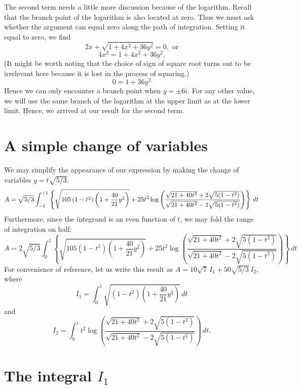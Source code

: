 \documentclass[12pt]{article}
\begin{document}
The second term needs a little more discussion because of the logarithm.  Recall that the branch point of the logarithm is also located at zero.  Thus we must ask whether the argument can equal zero along the path of integration.
Setting it equal to zero, we find
 $$2x + \sqrt{ 1 + 4 x^2 + 36 y^2 } = 0,\mbox{ or}$$
 $$4x^2 = 1 + 4 x^2 + 36 y^2.$$
(It might be worth noting that the choice of sign of square root turns out to be irrelevant here because it is lost in the process of squaring.)
 $$0 = 1 + 36 y^2$$
Hence we can only encounter a branch point when $y = \pm 6 i$.  For any other value, we will use the same branch of the logarithm at the upper limit as at the lower limit.   Hence, we arrived at our result for the second term.

\section{A simple change of variables}

We may simplify the appearance of our expression by making the change of variables $y = t \sqrt{5/3}$.
 $$A = \sqrt{5/3} \int_{-1}^{+1} \left\{ \sqrt{ 105 \left( 1 - t^2 \right) \left( 1 + {40 \over 21} y^2 \right) } + 25 t^2 \log \left( \frac{\sqrt{21 + 40 t^2} + 2 \sqrt{5(1 - t^2)}}{\sqrt{21 + 40 t^2} - 2 \sqrt{5(1 - t^2)}} \right) \right\} \, dt$$
Furthermore, since the integrand is an even function of $t$, we may fold the range of integration on half:
 $$A = 2 \sqrt{5/3} \int_0^1 \left\{ \sqrt{ 105 \left( 1 - t^2 \right) \left( 1 + \frac{40}{21} y^2 \right) } + 25 t^2 \log \left( \frac{\sqrt{21 + 40 t^2} + 2 \sqrt{5(1 - t^2)}}{\sqrt{21 + 40 t^2} - 2 \sqrt{5(1 - t^2)}} \right) \right\} \, dt$$
For convenience of reference, let us write this result as $A = 10 \sqrt{7} \, I_1 + 50 \sqrt{5/3} \, I_2$, where
 $$I_1 = \int_0^1 \sqrt{ \left( 1 - t^2 \right) \left( 1 + \frac{40}{21} y^2 \right) } \,dt$$
and
 $$I_2 = \int_0^1 t^2 \log \left( \frac{\sqrt{21 + 40 t^2} + 2 \sqrt{5(1 - t^2)}}{\sqrt{21 + 40 t^2} - 2 \sqrt{5(1 - t^2)}} \right) \, dt.$$

\section{The integral $I_1$}
\end{document}
